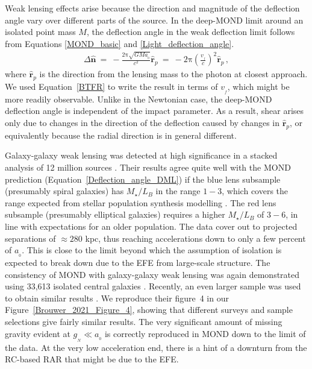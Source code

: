 \documentclass[fleqn,usenatbib,useAMS]{mnras} %
\begin{document}
Weak lensing effects arise because the direction and magnitude of the deflection angle vary over different parts of the source. In the deep-MOND limit around an isolated point mass $M$, the deflection angle in the weak deflection limit follows from Equations \ref{MOND_basic} and \ref {Light_deflection_angle}.
\begin{eqnarray}
	\Delta \widehat{\bm{n}} ~=~ -\frac{2\mathrm{\pi}\sqrt{GMa_{_0}}}{c^2} \widehat{\bm{r}}_p ~=~ -2\mathrm{\pi} \left( \frac{v_{_f}}{c}\right)^2 \widehat{\bm{r}}_p \, ,
	\label{Deflection_angle_DML}
\end{eqnarray}
where $\widehat{\bm{r}}_p$ is the direction from the lensing mass to the photon at closest approach. We used Equation~\ref{BTFR} to write the result in terms of $v_{_f}$, which might be more readily observable. Unlike in the Newtonian case, the deep-MOND deflection angle is independent of the impact parameter. As a result, shear arises only due to changes in the direction of the deflection caused by changes in $\widehat{\bm{r}}_p$, or equivalently because the radial direction is in general different.

Galaxy-galaxy weak lensing was detected at high significance in a stacked analysis of 12 million sources \citep{Brimioulle_2013}. Their results agree quite well with the MOND prediction (Equation~\ref{Deflection_angle_DML}) if the blue lens subsample (presumably spiral galaxies) has $M_{\star}/L_B$ in the range $1-3$, which covers the range expected from stellar population synthesis modelling \citep{Milgrom_2013}. The red lens subsample (presumably elliptical galaxies) requires a higher $M_{\star}/L_B$ of $3-6$, in line with expectations for an older population. The data cover out to projected separations of $\approx 280$ kpc, thus reaching accelerations down to only a few percent of $a_{_0}$. This is close to the limit beyond which the assumption of isolation is expected to break down due to the EFE from large-scale structure. The consistency of MOND with galaxy-galaxy weak lensing was again demonstrated using 33,613 isolated central galaxies \citep{Brouwer_2017}. Recently, an even larger sample was used to obtain similar results \citep{Brouwer_2021}. We reproduce their figure~4 in our Figure~\ref{Brouwer_2021_Figure_4}, showing that different surveys and sample selections give fairly similar results. The very significant amount of missing gravity evident at $g_{_N} \ll a_{_0}$ is correctly reproduced in MOND down to the limit of the data. At the very low acceleration end, there is a hint of a downturn from the RC-based RAR that might be due to the EFE.
\end{document}
